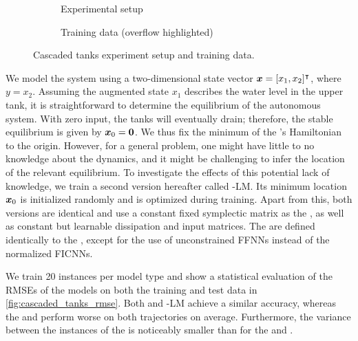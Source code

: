 \begin{figure}[t]
    \centering
    \vskip -1mm
    \begin{subfigure}[b]{0.39\columnwidth}
        \centering
                \caption{Experimental setup}
        \label{fig:cascaded_tanks.setup}
    \end{subfigure}
    \hfill
    \begin{subfigure}[b]{0.59\columnwidth}
        \centering
                \caption{Training data (overflow highlighted)}
        \label{fig:cascaded_tanks.training_data}
    \end{subfigure}
    \vspace*{-2mm}
    \caption{Cascaded tanks experiment setup and training data.}
    \label{fig:cascaded_tanks}
    \vskip -0.4cm
\end{figure}

We model the system using a two-dimensional state vector $\boldsymbol{x}=[x_1, x_2]^{\intercal}$, where $y=x_2$. 
Assuming the augmented state $x_1$ describes the water level in the upper tank, it is straightforward to determine the equilibrium of the autonomous system. With zero input, the tanks will eventually drain; therefore, the stable equilibrium is given by $\boldsymbol{x}_0=\boldsymbol{0}$. We thus fix the minimum of the \sPHNN's Hamiltonian to the origin.
However, for a general problem, one might have little to no knowledge about the dynamics, and it might be challenging to infer the location of the relevant equilibrium. 
To investigate the effects of this potential lack of knowledge, we train a second \sPHNN version hereafter called \sPHNN-LM.
Its minimum location $\boldsymbol{x}_0$ is initialized randomly and is optimized during training.
Apart from this, both \sPHNN versions are identical and use a constant fixed symplectic matrix as the \structurematrix, as well as constant but learnable dissipation and input matrices. 
The \PHNNs are defined identically to the \sPHNNs, except for the use of unconstrained \glspl{FFNN} instead of the normalized \glspl{FICNN}.

We train \num{20} instances per model type and show a statistical evaluation of the \glspl{RMSE} of the models on both the training and test data in \cref{fig:cascaded_tanks_rmse}. 
Both \sPHNN and \sPHNN-LM achieve a similar accuracy, whereas the \NODE and \PHNN perform worse on both trajectories on average. Furthermore, the variance between the instances of the \sPHNNs is noticeably smaller than for the \NODE and \PHNN. 

